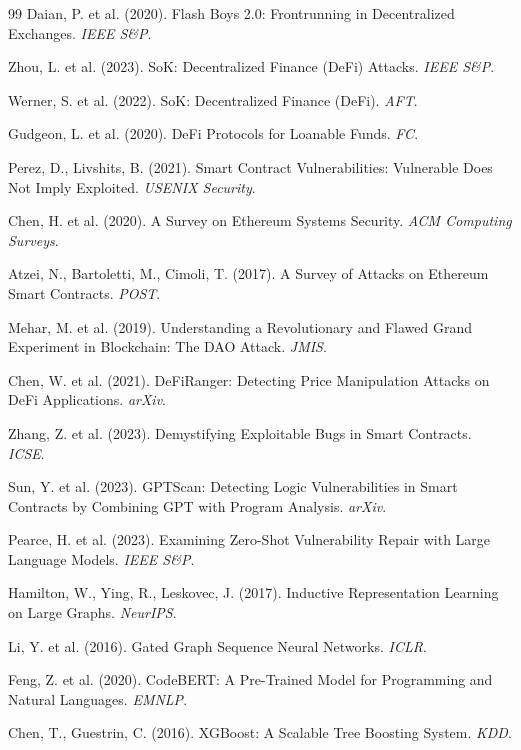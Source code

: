 \documentclass[11pt]{article}
\theoremstyle{definition}
\theoremstyle{plain}
\theoremstyle{remark}
\begin{document}
\begin{thebibliography}{99}
Daian, P. et al. (2020). Flash Boys 2.0: Frontrunning in Decentralized Exchanges. \textit{IEEE S\&P}.

Zhou, L. et al. (2023). SoK: Decentralized Finance (DeFi) Attacks. \textit{IEEE S\&P}.

Werner, S. et al. (2022). SoK: Decentralized Finance (DeFi). \textit{AFT}.

Gudgeon, L. et al. (2020). DeFi Protocols for Loanable Funds. \textit{FC}.

Perez, D., Livshits, B. (2021). Smart Contract Vulnerabilities: Vulnerable Does Not Imply Exploited. \textit{USENIX Security}.

Chen, H. et al. (2020). A Survey on Ethereum Systems Security. \textit{ACM Computing Surveys}.

Atzei, N., Bartoletti, M., Cimoli, T. (2017). A Survey of Attacks on Ethereum Smart Contracts. \textit{POST}.

Mehar, M. et al. (2019). Understanding a Revolutionary and Flawed Grand Experiment in Blockchain: The DAO Attack. \textit{JMIS}.

Chen, W. et al. (2021). DeFiRanger: Detecting Price Manipulation Attacks on DeFi Applications. \textit{arXiv}.

Zhang, Z. et al. (2023). Demystifying Exploitable Bugs in Smart Contracts. \textit{ICSE}.

Sun, Y. et al. (2023). GPTScan: Detecting Logic Vulnerabilities in Smart Contracts by Combining GPT with Program Analysis. \textit{arXiv}.

Pearce, H. et al. (2023). Examining Zero-Shot Vulnerability Repair with Large Language Models. \textit{IEEE S\&P}.

Hamilton, W., Ying, R., Leskovec, J. (2017). Inductive Representation Learning on Large Graphs. \textit{NeurIPS}.

Li, Y. et al. (2016). Gated Graph Sequence Neural Networks. \textit{ICLR}.

Feng, Z. et al. (2020). CodeBERT: A Pre-Trained Model for Programming and Natural Languages. \textit{EMNLP}.

Chen, T., Guestrin, C. (2016). XGBoost: A Scalable Tree Boosting System. \textit{KDD}.


\end{thebibliography}
\end{document}
